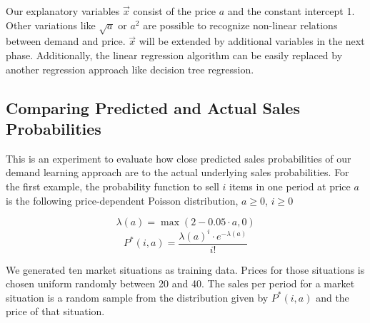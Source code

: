 Our explanatory variables $\vec{x}$ consist of the price $a$ and the constant intercept 1.
Other variations like $\sqrt{a}$ or $a^2$ are possible to recognize non-linear relations between demand and price.
$\vec{x}$ will be extended by additional variables in the next phase.
Additionally, the linear regression algorithm can be easily replaced by another regression approach like decision tree regression.

\subsection{Comparing Predicted and Actual Sales Probabilities}
\label{section:prediction_quality}

This is an experiment to evaluate how close predicted sales probabilities of our demand learning approach are to the actual underlying sales probabilities.
For the first example, the probability function to sell $i$ items in one period at price $a$ is the following price-dependent Poisson distribution, $a \geq 0$, $i \geq 0$

\begin{equation}
\lambda(a) = \max(2 - 0.05 \cdot a, 0)
\end{equation}
\begin{equation}
P^*(i, a) = \frac{\lambda(a)^i \cdot e^{-\lambda(a)}}{i!}
\end{equation}

We generated ten market situations as training data.
Prices for those situations is chosen uniform randomly between 20 and 40.
The sales per period for a market situation is a random sample from the distribution given by $P^*(i, a)$ and the price of that situation.


